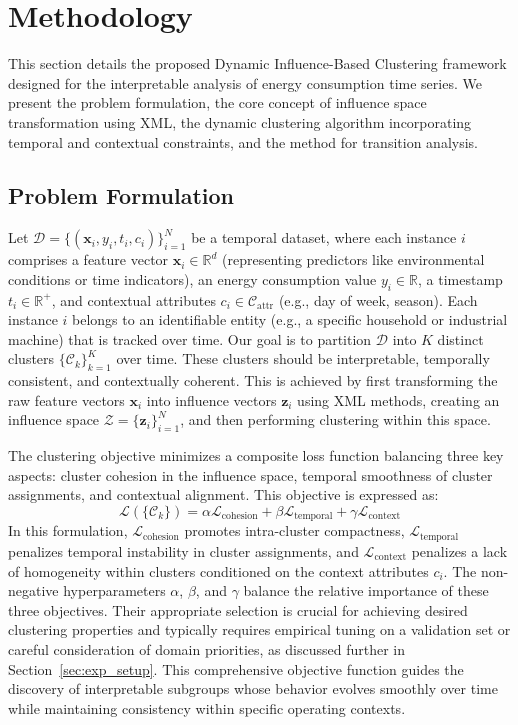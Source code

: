 \documentclass[final,authoryear,3p,times,review,sort&compress]{elsarticle}
\newcommand{\vect}[1]{\mathbf{#1}}
\newcommand{\set}[1]{\mathcal{#1}}
\begin{document}
\section{Methodology}
\label{sec:prob_formulation_method}
This section details the proposed Dynamic Influence-Based Clustering framework designed for the interpretable analysis of energy consumption time series. We present the problem formulation, the core concept of influence space transformation using XML, the dynamic clustering algorithm incorporating temporal and contextual constraints, and the method for transition analysis.

\subsection{Problem Formulation}
Let $\set{D} = \{ (\vect{x}_i, y_i, t_i, c_i) \}_{i=1}^N$ be a temporal dataset, where each instance $i$ comprises a feature vector $\vect{x}_i \in \mathbb{R}^d$ (representing predictors like environmental conditions or time indicators), an energy consumption value $y_i \in \mathbb{R}$, a timestamp $t_i \in \mathbb{R}^+$, and contextual attributes $c_i \in \set{C}_{\text{attr}}$ (e.g., day of week, season). Each instance $i$ belongs to an identifiable entity (e.g., a specific household or industrial machine) that is tracked over time. Our goal is to partition $\set{D}$ into $K$ distinct clusters $\{\set{C}_k\}_{k=1}^K$ over time. These clusters should be interpretable, temporally consistent, and contextually coherent. This is achieved by first transforming the raw feature vectors $\vect{x}_i$ into influence vectors $\vect{z}_i$ using XML methods, creating an influence space $\set{Z} = \{\vect{z}_i\}_{i=1}^N$, and then performing clustering within this space.

The clustering objective minimizes a composite loss function balancing three key aspects: cluster cohesion in the influence space, temporal smoothness of cluster assignments, and contextual alignment. This objective is expressed as:
\begin{equation}
\label{eq:full_objective}
    \mathcal{L}(\{\set{C}_k\}) = \alpha \mathcal{L}_{\text{cohesion}} + \beta \mathcal{L}_{\text{temporal}} + \gamma \mathcal{L}_{\text{context}}
\end{equation}
In this formulation, $\mathcal{L}_{\text{cohesion}}$ promotes intra-cluster compactness, $\mathcal{L}_{\text{temporal}}$ penalizes temporal instability in cluster assignments, and $\mathcal{L}_{\text{context}}$ penalizes a lack of homogeneity within clusters conditioned on the context attributes $c_i$. The non-negative hyperparameters $\alpha$, $\beta$, and $\gamma$ balance the relative importance of these three objectives. Their appropriate selection is crucial for achieving desired clustering properties and typically requires empirical tuning on a validation set or careful consideration of domain priorities, as discussed further in Section~\ref{sec:exp_setup}. This comprehensive objective function guides the discovery of interpretable subgroups whose behavior evolves smoothly over time while maintaining consistency within specific operating contexts.
\end{document}

